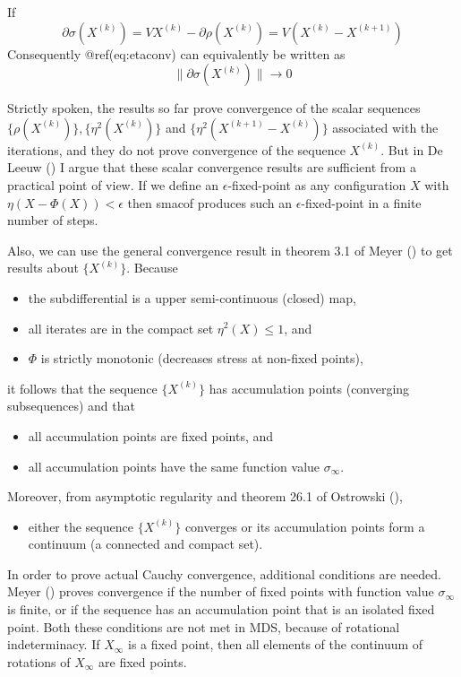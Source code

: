 \documentclass[
  12pt,
  letterpaper,
  DIV=11,
  numbers=noendperiod]{scrartcl}
\providecommand{\tightlist}{%
  \setlength{\itemsep}{0pt}\setlength{\parskip}{0pt}}\usepackage{longtable,booktabs,array}
\begin{document}
If \[
\partial\sigma(X^{(k)})=VX^{(k)}-\partial\rho(X^{(k)}) =V(X^{(k)}-X^{(k+1)})
\] Consequently @ref(eq:etaconv) can equivalently be written as \[
\|\partial\sigma(X^{(k)})\|\rightarrow 0
\]

Strictly spoken, the results so far prove convergence of the scalar
sequences \(\{\rho(X^{(k)})\}, \{\eta^2(X^{(k)})\}\) and
\(\{\eta^2(X^{(k+1)}-X^{(k)})\}\) associated with the iterations, and
they do not prove convergence of the sequence \(X^{(k)}\). But in De
Leeuw () I argue that these scalar
convergence results are sufficient from a practical point of view. If we
define an \(\epsilon\)-fixed-point as any configuration \(X\) with
\(\eta(X-\Phi(X))<\epsilon\) then smacof produces such an
\(\epsilon\)-fixed-point in a finite number of steps.

Also, we can use the general convergence result in theorem 3.1 of Meyer
() to get results about \(\{X^{(k)}\}\).
Because

\begin{itemize}
\tightlist
\item
  the subdifferential is a upper semi-continuous (closed) map,
\item
  all iterates are in the compact set \(\eta^2(X)\leq 1\), and
\item
  \(\Phi\) is strictly monotonic (decreases stress at non-fixed points),
\end{itemize}

it follows that the sequence \(\{X^{(k)}\}\) has accumulation points
(converging subsequences) and that

\begin{itemize}
\tightlist
\item
  all accumulation points are fixed points, and
\item
  all accumulation points have the same function value
  \(\sigma_\infty\).
\end{itemize}

Moreover, from asymptotic regularity and theorem 26.1 of Ostrowski
(),

\begin{itemize}
\tightlist
\item
  either the sequence \(\{X^{(k)}\}\) converges or its accumulation
  points form a continuum (a connected and compact set).
\end{itemize}

In order to prove actual Cauchy convergence, additional conditions are
needed. Meyer () proves convergence if the
number of fixed points with function value \(\sigma_\infty\) is finite,
or if the sequence has an accumulation point that is an isolated fixed
point. Both these conditions are not met in MDS, because of rotational
indeterminacy. If \(X_\infty\) is a fixed point, then all elements of
the continuum of rotations of \(X_\infty\) are fixed points.
\end{document}
